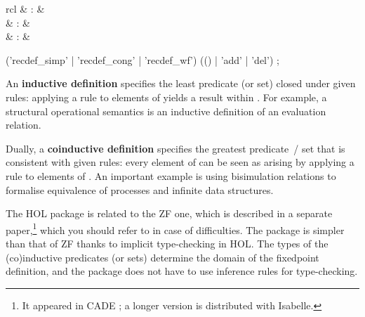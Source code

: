 \begin{isabellebody}
\begin{isamarkuptext}
  \begin{matharray}{rcl}
    \hypertarget{attribute.HOL.recdef-simp}{\hyperlink{attribute.HOL.recdef-simp}{\mbox{}}} & : &  \\
    \hypertarget{attribute.HOL.recdef-cong}{\hyperlink{attribute.HOL.recdef-cong}{\mbox{}}} & : &  \\
    \hypertarget{attribute.HOL.recdef-wf}{\hyperlink{attribute.HOL.recdef-wf}{\mbox{}}} & : &  \\
  \end{matharray}

  \begin{rail}
    ('recdef\_simp' | 'recdef\_cong' | 'recdef\_wf') (() | 'add' | 'del')
    ;
  \end{rail}%
\end{isamarkuptext}%
\isamarkuptrue%
%
\isamarkuptrue%
%
\begin{isamarkuptext}%
An \textbf{inductive definition} specifies the least predicate (or
  set)  closed under given rules: applying a rule to elements
  of  yields a result within .  For example, a
  structural operational semantics is an inductive definition of an
  evaluation relation.

  Dually, a \textbf{coinductive definition} specifies the greatest
  predicate~/ set  that is consistent with given rules: every
  element of  can be seen as arising by applying a rule to
  elements of .  An important example is using bisimulation
  relations to formalise equivalence of processes and infinite data
  structures.

  \medskip The HOL package is related to the ZF one, which is
  described in a separate paper,\footnote{It appeared in CADE
  \cite{paulson-CADE}; a longer version is distributed with Isabelle.}
  which you should refer to in case of difficulties.  The package is
  simpler than that of ZF thanks to implicit type-checking in HOL.
  The types of the (co)inductive predicates (or sets) determine the
  domain of the fixedpoint definition, and the package does not have
  to use inference rules for type-checking.


\end{isamarkuptext}
\end{isabellebody}
